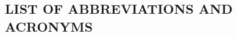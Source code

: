\setcounter{page}{1}
\renewcommand*\contentsname{\centering TABLE OF CONTENTS}
\tableofcontents


\begin{center}
\section*{LIST OF ABBREVIATIONS AND ACRONYMS}
\end{center}


